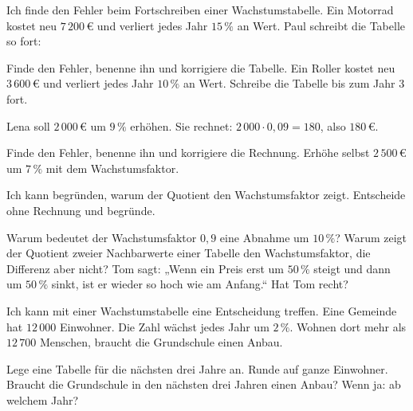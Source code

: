 \begin{aufgabe}{Ich finde den Fehler beim Fortschreiben einer Wachstumstabelle. Ein Motorrad kostet neu $7\,200\,€$ und verliert jedes Jahr $15\,\%$ an Wert. Paul schreibt die Tabelle so fort:}
\begin{teile}
\teil Finde den Fehler, benenne ihn und korrigiere die Tabelle.
\teil Ein Roller kostet neu $3\,600\,€$ und verliert jedes Jahr $10\,\%$ an Wert. Schreibe die Tabelle bis zum Jahr 3 fort.
\end{teile}
Lena soll $2\,000\,€$ um $9\,\%$ erhöhen. Sie rechnet: $2\,000 \cdot 0{,}09 = 180$, also $180\,€$.
\begin{teile}
\teil Finde den Fehler, benenne ihn und korrigiere die Rechnung.
\teil Erhöhe selbst $2\,500\,€$ um $7\,\%$ mit dem Wachstumsfaktor. \quad \leerfeld[€]
\end{teile}
\end{aufgabe}

\begin{aufgabe}{Ich kann begründen, warum der Quotient den Wachstumsfaktor zeigt. Entscheide ohne Rechnung und begründe.}
\begin{teile}
\teil Warum bedeutet der Wachstumsfaktor $0{,}9$ eine Abnahme um $10\,\%$?
\teil Warum zeigt der Quotient zweier Nachbarwerte einer Tabelle den Wachstumsfaktor, die Differenz aber nicht?
\teil Tom sagt: „Wenn ein Preis erst um $50\,\%$ steigt und dann um $50\,\%$ sinkt, ist er wieder so hoch wie am Anfang.“ Hat Tom recht?
\end{teile}
\end{aufgabe}

\begin{aufgabe}{Ich kann mit einer Wachstumstabelle eine Entscheidung treffen. Eine Gemeinde hat $12\,000$ Einwohner. Die Zahl wächst jedes Jahr um $2\,\%$. Wohnen dort mehr als $12\,700$ Menschen, braucht die Grundschule einen Anbau.}
\begin{teile}
\teil Lege eine Tabelle für die nächsten drei Jahre an. Runde auf ganze Einwohner.
\teil Braucht die Grundschule in den nächsten drei Jahren einen Anbau? Wenn ja: ab welchem Jahr?
\end{teile}
\end{aufgabe}
